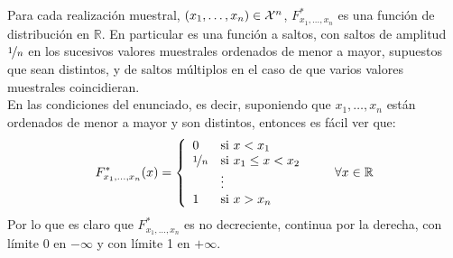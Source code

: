 \begin{ejemplo}
    Para cada realización muestral, $(x_1, \ldots, x_n)\in \mathcal{X}^n$, $F_{x_1,\ldots,x_n}^\ast$ es una función de distribución en $\mathbb{R}$. En particular es una función a saltos, con saltos de amplitud $\nicefrac{1}{n}$ en los sucesivos valores muestrales ordenados de menor a mayor, supuestos que sean distintos, y de saltos múltiplos en el caso de que varios valores muestrales coincidieran.\\

    \noindent
    En las condiciones del enunciado, es decir, suponiendo que $x_1, \ldots, x_n$ están ordenados de menor a mayor y son distintos, entonces es fácil ver que:
    \begin{equation*}
        F_{x_1, \ldots, x_n}^\ast (x) = \left\{\begin{array}{ll}
                0 & \text{si\ } x < x_1 \\
                \nicefrac{1}{n} & \text{si\ } x_1 \leq x < x_2 \\
                                &\vdots \\
                            1 & \text{si\ } x > x_n
        \end{array}\right. \qquad \forall x\in \mathbb{R}
    \end{equation*}
    Por lo que es claro que $F_{x_1, \ldots, x_n}^\ast $ es no decreciente, continua por la derecha, con límite 0 en $-\infty$ y con límite 1 en $+\infty$.
\end{ejemplo}

